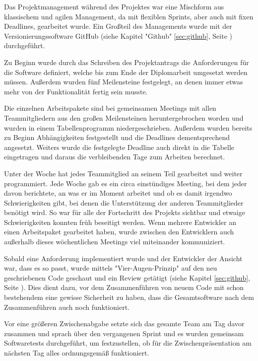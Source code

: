 \label{sec:ProManZELIA}

Das Projektmanagement während des Projektes war eine Mischform aus klassischem und agilen Management, da mit flexiblen Sprints, aber auch mit fixen Deadlines, gearbeitet wurde. Ein Großteil des Managements wurde mit der Versionierungssoftware GitHub (siehe Kapitel "Github" \ref{sec:github}, Seite \pageref{sec:github}) durchgeführt.

Zu Beginn wurde durch das Schreiben des Projektantrags die Anforderungen für die Software definiert, welche bis zum Ende der Diplomarbeit umgesetzt werden müssen. Außerdem wurden fünf Meilensteine festgelegt, an denen immer etwas mehr von der Funktionalität fertig sein musste.

Die einzelnen Arbeitspakete sind bei gemeinsamen Meetings mit allen Teammitgliedern aus den großen Meilensteinen heruntergebrochen worden und wurden in einem Tabellenprogramm niedergeschrieben. Außerdem wurden bereits zu Beginn Abhängigkeiten festgestellt und die Deadlines dementsprechend angesetzt. Weiters wurde die festgelegte Deadline auch direkt in die Tabelle eingetragen und daraus die verbleibenden Tage zum Arbeiten berechnet.  

Unter der Woche hat jedes Teammitglied an seinem Teil gearbeitet und weiter programmiert. Jede Woche gab es ein circa einstündiges Meeting, bei dem jeder davon berichtete, an was er im Moment arbeitet und ob es damit irgendwo Schwierigkeiten gibt, bei denen die Unterstützung der anderen Teammitglieder benötigt wird. So war für alle der Fortschritt des Projekts sichtbar und etwaige Schwierigkeiten konnten früh beseitigt werden. Wenn mehrere Entwickler an einen Arbeitspaket gearbeitet haben, wurde zwischen den Entwicklern auch außerhalb dieses wöchentlichen Meetings viel miteinander kommuniziert.

Sobald eine Anforderung implementiert wurde und der Entwickler der Ansicht war, dass es so passt, wurde mittels "Vier-Augen-Prinzip" auf den neu geschriebenen Code geschaut und ein Review getätigt (siehe Kapitel \ref{sec:github}, Seite \pageref{sec:github}). Dies dient dazu, vor dem Zusammenführen von neuem Code mit schon bestehendem eine gewisse Sicherheit zu haben, dass die Gesamtsoftware nach dem Zusammenführen auch noch funktioniert.

Vor eine größeren Zwischenabgabe setzte sich das gesamte Team am Tag davor zusammen und sprach über den vergangenen Sprint und es wurden gemeinsam Softwaretests durchgeführt, um festzustellen, ob für die Zwischenpräsentation am nächsten Tag alles ordnungsgemäß funktioniert. 

